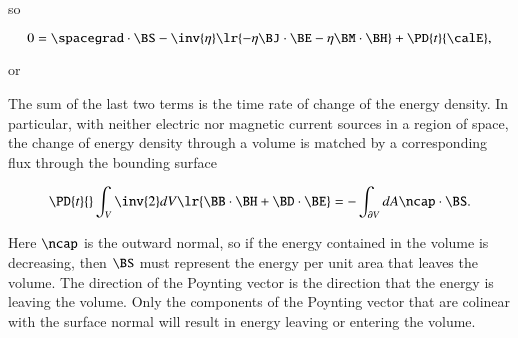 so

\begin{dmath}\label{eqn:poyntingF:180}
0 =
\spacegrad \cdot \BS
-
\inv{\eta}
\lr{
- \eta \BJ \cdot \BE
- \eta \BM \cdot \BH
}
+ \PD{t}{\calE},
\end{dmath}

or

The sum of the last two terms is the time rate of change of the energy density.
In particular,
with neither electric nor magnetic current sources in a region of space,
the change of energy density through a volume is matched by a corresponding flux through the bounding surface

\begin{dmath}\label{eqn:maxwellsEquations:740}
\PD{t}{} \int_V
\inv{2} dV \lr{
\BB \cdot \BH
+ \BD \cdot \BE
}
=
-\int_{\partial V} dA \ncap \cdot \BS.
\end{dmath}

Here \( \ncap \) is the outward normal, so if the energy contained in the volume is decreasing, then \( \BS \) must represent the energy per unit area that leaves the volume.
The direction of the Poynting vector is the direction that the energy is leaving the volume.
Only the components of the Poynting vector that are colinear with the surface normal will result in energy leaving or entering the volume.

